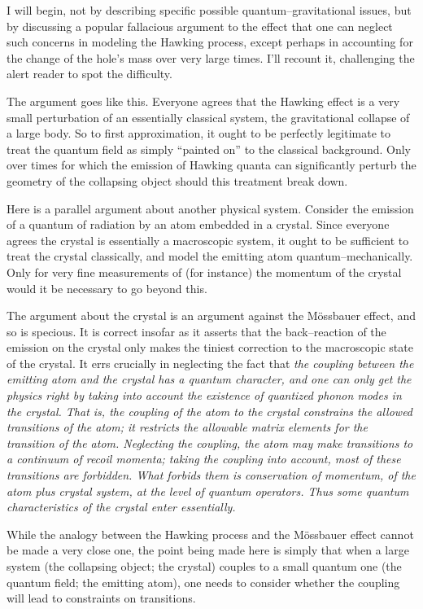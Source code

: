 I will begin, not by describing specific possible quantum--gravitational
issues, but by discussing a popular fallacious argument to the effect that one
can neglect such concerns in modeling the Hawking process, except perhaps in
accounting for the change of the hole's mass over very large times.  I'll
recount it, challenging the alert reader to spot the difficulty.

The argument goes like this.  Everyone agrees that the Hawking effect is a very
small perturbation of an essentially classical system, the gravitational
collapse of a large body.  So to first approximation, it ought to be perfectly
legitimate to treat the quantum field as simply ``painted on'' to the classical
background.  Only over times for which the emission of Hawking quanta can
significantly perturb the geometry of the collapsing object should this
treatment break down.

Here is a parallel argument about another physical system.  Consider the
emission of a quantum of radiation by an atom embedded in a crystal.  Since
everyone agrees the crystal is essentially a macroscopic system, it ought to be
sufficient to treat the crystal classically, and model the emitting atom
quantum--mechanically.  Only for very fine measurements of (for instance) the
momentum of the crystal would it be necessary to go beyond this.

The argument about the crystal is an argument against the M\"ossbauer effect,
and so is specious.   It is correct insofar as it asserts that the
back--reaction of the emission on the crystal only makes the tiniest correction
to the macroscopic state of the crystal. It errs crucially in neglecting the
fact that \it the coupling between the emitting atom and the crystal has a
quantum character, \rm and one can only get the physics right by taking into
account the existence of quantized phonon modes in the crystal.  That is, the
coupling of the atom to the crystal \it constrains \rm the allowed transitions
of the atom; it restricts the allowable matrix elements for the transition of
the atom.  Neglecting the coupling, the atom may make transitions to a
continuum of recoil momenta; taking the coupling into account, most of these
transitions are forbidden.  What forbids them is conservation of momentum, of
the atom plus crystal system, at the level of quantum operators.  Thus some
quantum characteristics of the crystal enter essentially.

While the analogy between the Hawking process and the M\"ossbauer effect cannot
be made a very close one, the point being made here is simply that when a large
system (the collapsing object; the crystal) couples to a small quantum one (the
quantum field; the emitting atom), one needs to consider whether the coupling
will lead to constraints on transitions.

